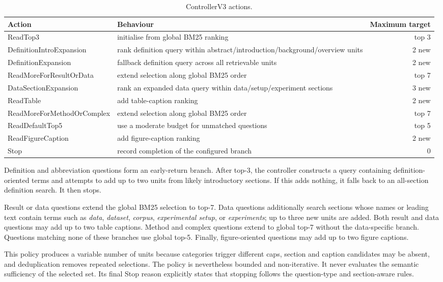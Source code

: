 \begin{table}[tb]
\centering
\caption{ControllerV3 actions.}
\label{tab:actions}
\begin{tabularx}{\textwidth}{@{}lXr@{}}
\toprule
Action & Behaviour & Maximum target \\
\midrule
ReadTop3 & initialise from global BM25 ranking & top 3 \\
DefinitionIntroExpansion & rank definition query within abstract/introduction/background/overview units & 2 new \\
DefinitionExpansion & fallback definition query across all retrievable units & 2 new \\
ReadMoreForResultOrData & extend selection along global BM25 order & top 7 \\
DataSectionExpansion & rank an expanded data query within data/setup/experiment sections & 3 new \\
ReadTable & add table-caption ranking & 2 new \\
ReadMoreForMethodOrComplex & extend selection along global BM25 order & top 7 \\
ReadDefaultTop5 & use a moderate budget for unmatched questions & top 5 \\
ReadFigureCaption & add figure-caption ranking & 2 new \\
Stop & record completion of the configured branch & 0 \\
\bottomrule
\end{tabularx}
\end{table}

Definition and abbreviation questions form an early-return branch. After top-3, the controller constructs a query containing definition-oriented terms and attempts to add up to two units from likely introductory sections. If this adds nothing, it falls back to an all-section definition search. It then stops.

Result or data questions extend the global BM25 selection to top-7. Data questions additionally search sections whose names or leading text contain terms such as \emph{data}, \emph{dataset}, \emph{corpus}, \emph{experimental setup}, or \emph{experiments}; up to three new units are added. Both result and data questions may add up to two table captions. Method and complex questions extend to global top-7 without the data-specific branch. Questions matching none of these branches use global top-5. Finally, figure-oriented questions may add up to two figure captions.

This policy produces a variable number of units because categories trigger different caps, section and caption candidates may be absent, and deduplication removes repeated selections. The policy is nevertheless bounded and non-iterative. It never evaluates the semantic sufficiency of the selected set. Its final Stop reason explicitly states that stopping follows the question-type and section-aware rules.

